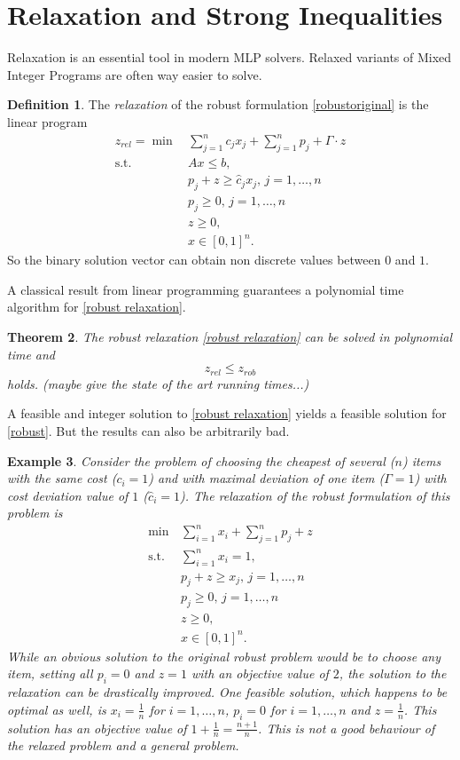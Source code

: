 \documentclass[titlepage, a4paper]{amsbook}
\theoremstyle{plain}
\newtheorem{thm}{Theorem}[chapter]
\theoremstyle{break}
\newtheorem{exm}[thm]{Example}
\theoremstyle{definition}
\newtheorem{dfn}[thm]{Definition}
\theoremstyle{remark}
\numberwithin{equation}{thm}
\begin{document}
\section{Relaxation and Strong Inequalities}
Relaxation is an essential tool in modern MLP solvers. Relaxed variants of Mixed Integer Programs are often way easier to solve.
\begin{dfn}
The \emph{relaxation} of the robust formulation \eqref{robustoriginal} is the linear program
\begin{equation}\label{robust relaxation}
\begin{split}
    z_{rel}=\min\, &\sum_{j=1}^{n} c_j x_j + \sum_{j=1}^{n}p_j + \Gamma \cdot z\\
    \text{s.t. } &Ax \leq b, \\
    &p_j+ z \geq \hat{c}_jx_j, \, j=1, \ldots,n\\
  &p_j \geq 0, \, j=1, \ldots, n \\
  &z \geq 0, \\
    &x \in [0,1]^n.
\end{split}
\end{equation}
So the binary solution vector can obtain non discrete values between $0$ and $1$. 
\end{dfn}
A classical result from linear programming guarantees a polynomial time algorithm for \eqref{robust relaxation}.
\begin{thm}
The robust relaxation \eqref{robust relaxation} can be solved in polynomial time and 
\[z_{rel} \leq z_{rob}\]
holds.
(maybe give the state of the art running times...)
\end{thm}
A feasible and integer solution to \eqref{robust relaxation} yields a feasible solution for \eqref{robust}.
But the results can also be arbitrarily bad.
\begin{exm}\label{exm: choose best item}
Consider the problem of choosing the cheapest of several ($n$) items with the same cost ($c_i=1$) and with maximal deviation of one item ($\Gamma=1$) with cost deviation value of $1$ ($\hat{c}_i=1$). The relaxation of the robust formulation of this problem is
\begin{equation*}
    \begin{split}
        \min \, &\sum_{i=1}^{n}x_i + \sum_{j=1}^{n}p_j + z\\
        \text{s.t. } &\sum_{i=1}^{n}x_i = 1, \\
        &p_j+ z \geq x_j, \, j=1, \ldots,n\\
     &p_j \geq 0, \, j=1, \ldots, n \\
    &z \geq 0, \\
    &x \in [0,1]^n.
    \end{split}
\end{equation*}
While an obvious solution to the original robust problem would be to choose any item, setting all $p_i=0$ and $z=1$ with an objective value of $2$, the solution to the relaxation can be drastically improved. 
One feasible solution, which happens to be optimal as well, is $x_i=\frac{1}{n}$ for $i=1, \ldots,n$, $p_i=0$ for $i=1, \ldots,n$ and $z=\frac{1}{n}$. This solution has an objective value of $1+\frac{1}{n}=\frac{n+1}{n}$. This is not a good behaviour of the relaxed problem and a general problem.
\end{exm}
\end{document}
